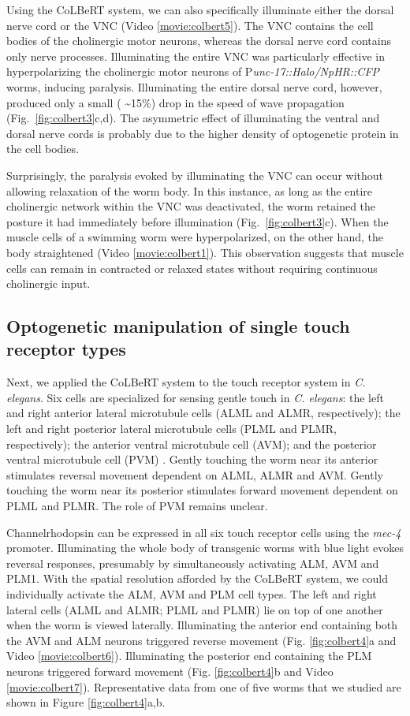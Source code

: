 Using the CoLBeRT system, we can also specifically illuminate either the dorsal nerve cord or the VNC (Video \ref{movie:colbert5}). The VNC contains the cell bodies of the cholinergic motor neurons, whereas the dorsal nerve cord contains only nerve processes. Illuminating the entire VNC was particularly effective in hyperpolarizing the cholinergic motor neurons of P\textit{unc-17::Halo/NpHR::CFP} worms, inducing paralysis. Illuminating the entire dorsal nerve cord, however, produced only a small ( \textasciitilde15\%) drop in the speed of wave propagation (Fig.~\ref{fig:colbert3}c,d). The asymmetric effect of illuminating the ventral and dorsal nerve cords is probably due to the higher density of optogenetic protein in the cell bodies.

Surprisingly, the paralysis evoked by illuminating the VNC can occur without allowing relaxation of the worm body. In this instance, as long as the entire cholinergic network within the VNC was deactivated, the worm retained the posture it had immediately before illumination (Fig.~\ref{fig:colbert3}c). When the muscle cells of a swimming worm were hyperpolarized, on the other hand, the body straightened (Video \ref{movie:colbert1}). This observation suggests that muscle cells can remain in contracted or relaxed states without requiring continuous cholinergic input.


\subsection{Optogenetic manipulation of single touch receptor types}
Next, we applied the CoLBeRT system to the touch receptor system in \textit{C. elegans}. Six cells are specialized for sensing gentle touch in \textit{C. elegans}: the left and right anterior lateral microtubule cells (ALML and ALMR, respectively); the left and right posterior lateral microtubule cells (PLML and PLMR, respectively); the anterior ventral microtubule cell (AVM); and the posterior ventral microtubule cell (PVM) \citep{chalfie_neural_1985}. Gently touching the worm near its anterior stimulates reversal movement dependent on ALML, ALMR and AVM. Gently touching the worm near its posterior stimulates forward movement dependent on PLML and PLMR. The role of PVM remains unclear.

Channelrhodopsin can be expressed in all six touch receptor cells using the \textit{mec-4} promoter. Illuminating the whole body of transgenic worms with blue light evokes reversal responses, presumably by simultaneously activating ALM, AVM and PLM1. With the spatial resolution afforded by the CoLBeRT system, we could individually activate the ALM, AVM and PLM cell types. The left and right lateral cells (ALML and ALMR; PLML and PLMR) lie on top of one another when the worm is viewed laterally. Illuminating the anterior end containing both the AVM and ALM neurons triggered reverse movement (Fig. \ref{fig:colbert4}a and Video \ref{movie:colbert6}). Illuminating the posterior end containing the PLM neurons triggered forward movement (Fig. \ref{fig:colbert4}b and Video \ref{movie:colbert7}). Representative data from one of five worms that we studied are shown in Figure \ref{fig:colbert4}a,b.



